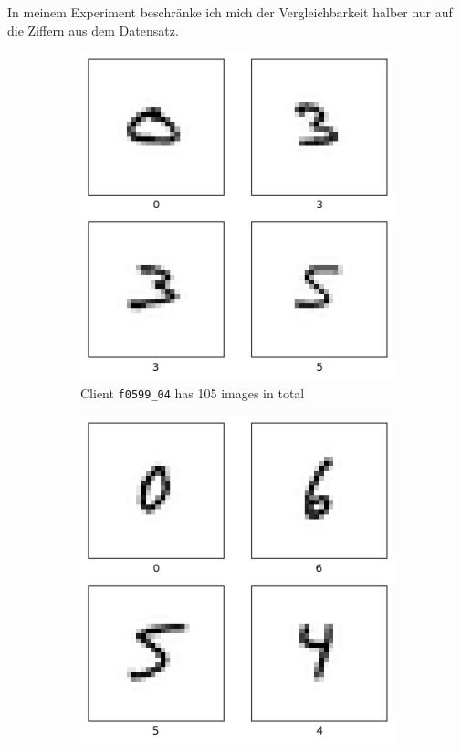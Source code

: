 In meinem Experiment beschränke ich mich der Vergleichbarkeit halber nur auf die Ziffern aus dem Datensatz.

\begin{figure}[tb]
    \centering
    \begin{subfigure}{0.4\textwidth}
		\centering        
        \includegraphics[width=\linewidth]{Bilder/emnist_client1.png}
        \caption{Client \texttt{f0599\_04} has 105 images in total}
    \end{subfigure}
    \hfill
    \begin{subfigure}{0.4\textwidth}
    		\centering        
        \includegraphics[width=\linewidth]{Bilder/emnist_client2.png}

\end{subfigure}
\end{figure}

